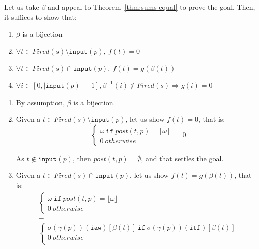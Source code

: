 \begin{pf}
\begin{itemize}
    Let us take $\beta$ and appeal to Theorem~\ref{thm:sums-equal} to
    prove the goal. Then, it suffices to show that:
    \begin{enumerate}
    \item $\beta$ is a bijection
    \item $\forall{}t\in{}Fired(s)\setminus{}\mathtt{input}(p),~f(t)=0$
    \item $\forall{}t\in{}Fired(s)\cap{}\mathtt{input}(p),~f(t)=g(\beta(t))$
    \item
      $\forall{}i\in{}[0,\vert\mathtt{input}(p)\vert-1],\beta^{-1}(i)\notin{}Fired(s)\Rightarrow{}g(i)=0$
    \end{enumerate}

    \bigskip
    
    \begin{enumerate}
    \item By assumption, $\beta$ is a bijection.
    \item Given a $t\in{}Fired(s)\setminus{}\mathtt{input}(p)$, let us
      show $f(t)=0$, that is:
      \begin{equation*}
        \boxed{
          \begin{cases}
            \omega~\mathtt{if}~post(t,p)=\lfloor\omega\rfloor \\
            0~otherwise
          \end{cases}=0
        }
      \end{equation*}

      \noindent{}As $t\notin{}\mathtt{input}(p)$, then
      $post(t,p)=\emptyset$, and that settles the goal.
      
    \item Given a $t\in{}Fired(s)\cap\mathtt{input}(p)$, let us show
      $f(t)=g(\beta(t))$, that is:
      \begin{equation*}
        \boxed{\begin{array}{c}
          \begin{cases}
            \omega~\mathtt{if}~post(t,p)=\lfloor\omega\rfloor \\
            0~otherwise
          \end{cases} \\
          = \\
          \begin{cases}
            \sigma(\gamma(p))(\texttt{iaw})[\beta(t)]~\mathtt{if}~\sigma(\gamma(p))(\texttt{itf})[\beta(t)] \\
            0~otherwise \\
          \end{cases} \\         
        \end{array}}
      \end{equation*}



\end{enumerate}
\end{itemize}
\end{pf}
